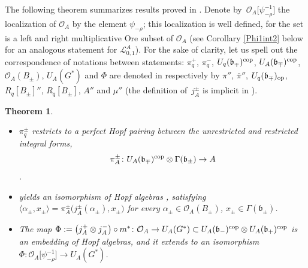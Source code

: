 \documentclass[10pt,a4paper]{amsart}
\numberwithin{equation}{section}
\newtheorem{teo}{Theorem}[section]
\theoremstyle{definition}
\newcommand{\mn}{\mathbb{N}}
\newcommand{\Ll}{{\mathcal L}}
\newcommand{\Oo}{{\mathcal O}}
\newcommand{\ra}{\rightarrow}
\begin{document}
The following theorem summarizes results proved in \cite[Sections~3 and~4]{DC-L}. Denote by~$\Oo_{\!A}\!\big[\psi_{-\rho}^{-1}\big]$ the localization of $\Oo_A$ by the element $\psi_{-\rho}$; this localization is well defined, for the set \smash{$\{\psi_{-\rho}^n\}_{n\in \mn}$} is a left and right multiplicative Ore subset of $\Oo_A$ (see Corollary \ref{Phi1int2} below for an analogous statement for $\Ll_{0,1}^A$). For the sake of clarity, let us spell out the correspondence of notations between statements: $\pi^+_q$, $\pi^-_q$, $U_q(\mathfrak{b}_\mp)^{\rm cop}$, $U_A(\mathfrak{b}_\mp)^{\rm cop}$, $\Oo_A(B_\pm)$, $U_A(G^*)$ and $\Phi$ are denoted in \cite{DC-L} respectively by $\pi''$, $\bar{\pi}''$, $U_q(\mathfrak{b}_\mp)_{\rm op}$, $R_q[B_\pm]''$, $R_q[B_\pm]$, $A''$ and $\mu''$ (the definition of~$j_A^\pm$ is implicit in \cite[Section 4.2]{DC-L}).

\begin{teo}\label{Phimap}\quad
\begin{itemize}\itemsep=0pt
\item[$(1)$] $\pi^\pm_q$ restricts to a perfect Hopf pairing between the unrestricted and restricted integral forms, \[\pi^{\pm}_A\colon U_A(\mathfrak{b}_\mp)^{\rm cop}\otimes \Gamma(\mathfrak{b}_\pm)\ra A\].
\item[$(2)$]  yields an isomorphism of Hopf algebras \smash{$j_A^\pm\colon \Oo_A(B_\pm) \!\ra\! U_A(\mathfrak{b}_\mp)^{\rm cop}$}, satisfying $\langle \alpha_\pm,x_\pm\rangle\! = \pi^{\pm}_A\big(j_A^\pm(\alpha_\pm),x_\pm\big)$ for every $\alpha_\pm \in \Oo_A(B_\pm)$, $x_\pm\in \Gamma(\mathfrak{b}_\pm)$.
\item[$(3)$] The map $\Phi := \big(j_A^+\otimes j_A^-\big)\circ m^*\colon \Oo_A \ra U_A(G^*) \subset U_A(\mathfrak{b}_-)^{\rm cop}\otimes U_A(\mathfrak{b}_+)^{\rm cop}$ is an embedding of Hopf algebras, and it extends to an isomorphism $\Phi \colon \Oo_A\big[\psi_{-\rho}^{-1}\big] \ra U_A(G^*)$.
 \end{itemize}
\end{teo}
\end{document}
